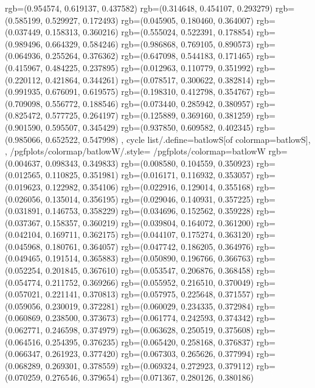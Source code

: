{{{					rgb=(0.954574, 0.619137, 0.437582)
					rgb=(0.314648, 0.454107, 0.293279)
					rgb=(0.585199, 0.529927, 0.172493)
					rgb=(0.045905, 0.180460, 0.364007)
					rgb=(0.037449, 0.158313, 0.360216)
					rgb=(0.555024, 0.522391, 0.178854)
					rgb=(0.989496, 0.664329, 0.584246)
					rgb=(0.986868, 0.769105, 0.890573)
					rgb=(0.064936, 0.255264, 0.376362)
					rgb=(0.647098, 0.544183, 0.171465)
					rgb=(0.415967, 0.484225, 0.237895)
					rgb=(0.012963, 0.110779, 0.351992)
					rgb=(0.220112, 0.421864, 0.344261)
					rgb=(0.078517, 0.300622, 0.382814)
					rgb=(0.991935, 0.676091, 0.619575)
					rgb=(0.198310, 0.412798, 0.354767)
					rgb=(0.709098, 0.556772, 0.188546)
					rgb=(0.073440, 0.285942, 0.380957)
					rgb=(0.825472, 0.577725, 0.264197)
					rgb=(0.125889, 0.369160, 0.381259)
					rgb=(0.901590, 0.595507, 0.345429)
					rgb=(0.937850, 0.609582, 0.402345)
					rgb=(0.985066, 0.652522, 0.547998)
			},
		cycle list/.define={batlowS}{[of colormap=batlowS]},
		},
		/pgfplots/colormap/batlowW/.style={
			/pgfplots/colormap={batlowW}{%
					rgb=(0.004637, 0.098343, 0.349833)
					rgb=(0.008580, 0.104559, 0.350923)
					rgb=(0.012565, 0.110825, 0.351981)
					rgb=(0.016171, 0.116932, 0.353057)
					rgb=(0.019623, 0.122982, 0.354106)
					rgb=(0.022916, 0.129014, 0.355168)
					rgb=(0.026056, 0.135014, 0.356195)
					rgb=(0.029046, 0.140931, 0.357225)
					rgb=(0.031891, 0.146753, 0.358229)
					rgb=(0.034696, 0.152562, 0.359228)
					rgb=(0.037367, 0.158357, 0.360219)
					rgb=(0.039804, 0.164072, 0.361200)
					rgb=(0.042104, 0.169711, 0.362175)
					rgb=(0.044107, 0.175274, 0.363120)
					rgb=(0.045968, 0.180761, 0.364057)
					rgb=(0.047742, 0.186205, 0.364976)
					rgb=(0.049465, 0.191514, 0.365883)
					rgb=(0.050890, 0.196766, 0.366763)
					rgb=(0.052254, 0.201845, 0.367610)
					rgb=(0.053547, 0.206876, 0.368458)
					rgb=(0.054774, 0.211752, 0.369266)
					rgb=(0.055952, 0.216510, 0.370049)
					rgb=(0.057021, 0.221141, 0.370813)
					rgb=(0.057975, 0.225648, 0.371557)
					rgb=(0.059056, 0.230019, 0.372281)
					rgb=(0.060029, 0.234335, 0.372984)
					rgb=(0.060869, 0.238500, 0.373673)
					rgb=(0.061774, 0.242593, 0.374342)
					rgb=(0.062771, 0.246598, 0.374979)
					rgb=(0.063628, 0.250519, 0.375608)
					rgb=(0.064516, 0.254395, 0.376235)
					rgb=(0.065420, 0.258168, 0.376837)
					rgb=(0.066347, 0.261923, 0.377420)
					rgb=(0.067303, 0.265626, 0.377994)
					rgb=(0.068289, 0.269301, 0.378559)
					rgb=(0.069324, 0.272923, 0.379112)
					rgb=(0.070259, 0.276546, 0.379654)
					rgb=(0.071367, 0.280126, 0.380186)
}}}
